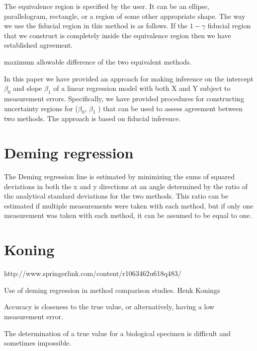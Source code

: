 The equivalence region is specified by the user. It can be an ellipse, parallelogram,
rectangle, or a region of some other appropriate shape. The way we use the fiducial region in this method is as follows. If
the $1−\gamma$ fiducial region that we construct is completely inside the equivalence region then we have established agreement.

maximum allowable difference of the two equivalent methods.

In this paper we have provided an approach for making inference on the intercept $\beta_0$ and slope $\beta_1$ of a linear regression
model with both X and Y subject to measurement errors. Specifically, we have provided procedures for constructing
uncertainty regions for ($\beta_0$, $\beta_1$ ) that can be used to assess agreement between two methods. The approach is based on
fiducial inference.



\section*{Deming regression}
The Deming regression line is estimated by minimizing the sums of squared deviations in both the x and y directions at an angle determined by the ratio of the analytical standard deviations for the two methods.
This ratio can be estimated if multiple measurements were taken with each method, but if only one measurement was taken with each method, it can be assumed to be equal to one.


\section*{Koning}
http://www.springerlink.com/content/r1063462u618q483/

Use of deming regression in method comparison studies.
Henk Konings

Accuracy is closeness to the true value, or alternatively, having a low measurement error.

The determination of a true value for a biological specimen is difficult and sometimes impossible.

